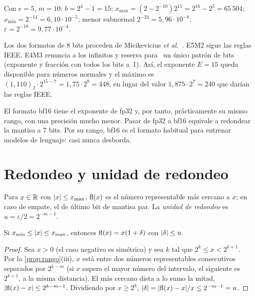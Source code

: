 \begin{ejemplo}[fp16]\label{ej:fp16}
Con $e=5$, $m=10$: $b=2^{4}-1=15$; $x_{\max}=(2-2^{-10})2^{15}=2^{16}-2^{5}=65\,504$; $x_{\min}=2^{-14}=6{,}10\cdot 10^{-5}$; menor subnormal $2^{-24}=5{,}96\cdot 10^{-8}$; $\varepsilon=2^{-10}=9{,}77\cdot 10^{-4}$.
\end{ejemplo}

\begin{observacion}[El formato E4M3]\label{obs:e4m3}
Los dos formatos de 8 bits proceden de Micikevicius \emph{et al.}~\cite{fp8}. E5M2 sigue las reglas IEEE. E4M3 renuncia a los infinitos y reserva para \NaN\ un único patrón de bits (exponente y fracción con todos los bits a~1). Así, el exponente $E=15$ queda disponible para números normales y el máximo es $(1{,}110)_2\cdot 2^{15-7}=1{,}75\cdot 2^{8}=448$, en lugar del valor $1{,}875\cdot 2^{7}=240$ que darían las reglas IEEE.
\end{observacion}

El formato bf16 tiene el exponente de fp32 y, por tanto, prácticamente su mismo rango, con una precisión mucho menor. Pasar de fp32 a bf16 equivale a redondear la mantisa a 7 bits. Por su rango, bf16 es el formato habitual para entrenar modelos de lenguaje: casi nunca desborda.

\section{Redondeo y unidad de redondeo}

\begin{definicion}\label{def:fl}
Para $x\in\mathbb{R}$ con $\lvert x\rvert\le x_{\max}$, $\operatorname{fl}(x)$ es el número representable más cercano a $x$; en caso de empate, el de último bit de mantisa par. La \emph{unidad de redondeo} es $u=\varepsilon/2=2^{-m-1}$.
\end{definicion}

\begin{teorema}\label{teo:redondeo}
Si $x_{\min}\le\lvert x\rvert\le x_{\max}$, entonces $\operatorname{fl}(x)=x(1+\delta)$ con $\lvert\delta\rvert\le u$.
\end{teorema}

\begin{proof}
Sea $x>0$ (el caso negativo es simétrico) y sea $k$ tal que $2^{k}\le x<2^{k+1}$. Por la \cref{prop:rango}(iii), $x$ está entre dos números representables consecutivos separados por $2^{k-m}$ (si $x$ supera el mayor número del intervalo, el siguiente es $2^{k+1}$, a la misma distancia). El más cercano dista a lo sumo la mitad, $\lvert\operatorname{fl}(x)-x\rvert\le 2^{k-m-1}$. Dividiendo por $x\ge 2^{k}$, $\lvert\delta\rvert=\lvert\operatorname{fl}(x)-x\rvert/x\le 2^{-m-1}=u$.
\end{proof}

